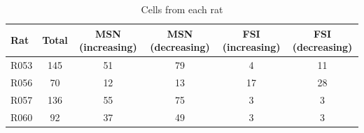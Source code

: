 \documentclass[11pt]{article}
\begin{document}
\begin{table}
[p]
\centering
\setlength{\tabcolsep}{1 em} %
\begin{tabular}{l c  c c c c}

Rat                                  & Total        & MSN (increasing)        & MSN (decreasing)        &FSI (increasing)        &FSI (decreasing)\\
\hline
R053                       & 145         & 51          & 79          & 4         & 11\\
\hline
R056                       & 70         & 12          & 13         & 17          & 28\\
\hline
R057   	          & 136         & 55          & 75          & 3          & 3\\
\hline
R060                       & 92         & 37          & 49          & 3          & 3\\
\hline   

\end{tabular}
\caption {Cells from each rat} \label{tbl1} 
\end{table}
\end{document}
